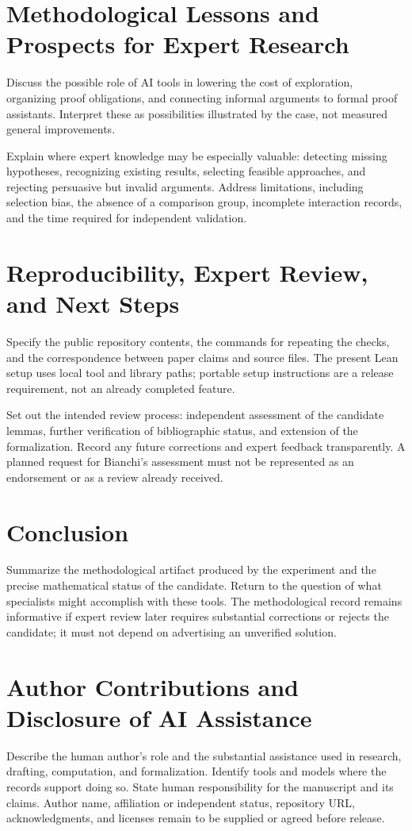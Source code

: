 \documentclass[11pt,a4paper]{article}
\begin{document}
\section{Methodological Lessons and Prospects for Expert Research}
Discuss the possible role of AI tools in lowering the cost of exploration,
organizing proof obligations, and connecting informal arguments to formal
proof assistants. Interpret these as possibilities illustrated by the case,
not measured general improvements.

Explain where expert knowledge may be especially valuable: detecting missing
hypotheses, recognizing existing results, selecting feasible approaches, and
rejecting persuasive but invalid arguments. Address limitations, including
selection bias, the absence of a comparison group, incomplete interaction
records, and the time required for independent validation.

\section{Reproducibility, Expert Review, and Next Steps}
Specify the public repository contents, the commands for repeating the
checks, and the correspondence between paper claims and source files.
The present Lean setup uses local tool and library paths; portable setup
instructions are a release requirement, not an already completed feature.

Set out the intended review process: independent assessment of the candidate
lemmas, further verification of bibliographic status, and extension of the
formalization. Record any future corrections and expert feedback transparently.
A planned request for Bianchi's assessment must not be represented as an
endorsement or as a review already received.

\section{Conclusion}
Summarize the methodological artifact produced by the experiment and the
precise mathematical status of the candidate. Return to the question of what
specialists might accomplish with these tools. The methodological record
remains informative if expert review later requires substantial corrections
or rejects the candidate; it must not depend on advertising an unverified
solution.

\section*{Author Contributions and Disclosure of AI Assistance}
Describe the human author's role and the substantial assistance used in
research, drafting, computation, and formalization. Identify tools and models
where the records support doing so. State human responsibility for the
manuscript and its claims. Author name, affiliation or independent status,
repository URL, acknowledgments, and licenses remain to be supplied or agreed
before release.
\end{document}
